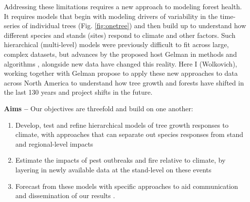 \documentclass[11pt]{article}
\begin{document}
Addressing these limitations requires a new approach to modeling forest health. It requires models that begin with modeling drivers of variability in the time-series of individual trees (Fig. \ref{fig:onetree}) and then build up to understand how different species and stands (sites) respond to climate and other factors. Such hierarchical (multi-level) models were previously difficult to fit across large, complex datasets, but advances by the proposed host Gelman \citep{BDA} in methods and algorithms \cite{hoffman2014no,Carpenter:2017stan}, alongside new data \citep{zhao2019international,pane2026spatial,williams2025western} have changed this reality. Here I (Wolkovich), working together with Gelman propose to apply these new approaches to data across North America to understand how tree growth and forests have shifted in the last 130 years and project shifts in the future. 

{\bf Aims -- }Our objectives are threefold and build on one another: 
\begin{enumerate}
\item Develop, test and refine hierarchical models of tree growth responses to climate, with approaches that can separate out species responses from stand and regional-level impacts \citep{BDA}
\item Estimate the impacts of pest outbreaks and fire relative to climate, by layering in newly available data \citep{zhao2019international,pane2026spatial,williams2025western} at the stand-level on these events
\item Forecast from these models with specific approaches to aid communication and dissemination of our results \citep[][described further under \emph{Expected outputs \& impact} below]{gelmanhill,BDA,regotherstories}. 
\end{enumerate}

\end{document}

